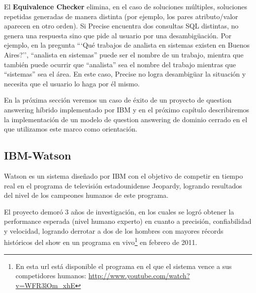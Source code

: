 El \textbf{Equivalence Checker} elimina, en el caso de soluciones múltiples, soluciones repetidas generadas de manera distinta (por ejemplo, los pares atributo/valor aparecen en otro orden). Si Precise encuentra dos consultas SQL distintas, no genera una respuesta sino que pide al usuario por una desambigüación. Por ejemplo, en la pregunta ```Qué trabajos de analista en sistemas existen en Buenos Aires?'', ``analista en sistemas'' puede ser el nombre de un trabajo, mientra que también puede ocurrir que ``analista'' sea el nombre del trabajo mientras que ``sistemas'' sea el área. En este caso, Precise no logra desambigüar la situación y necesita que el usuario lo haga por él mismo.

\medskip





En la próxima sección veremos un caso de éxito de un proyecto de question answering híbrido implementado por IBM y en el próximo capítulo describiremos la implementación de un modelo de question answering de dominio cerrado en el que utilizamos este marco como orientación.


\subsection{IBM-Watson}
\label{subsec:ibm-watson}
Watson\cite{WATSON1}\cite{WATSON2} es un sistema diseñado por IBM con el objetivo de competir en
tiempo real en el programa de televisión estadounidense Jeopardy,
logrando resultados del nivel de los campeones humanos de este
programa.

El proyecto demoró 3 años de investigación, en los cuales se
logró obtener la performance esperada (nivel humano experto) en
cuanto a precisión, confiabilidad y velocidad, logrando derrotar a
dos de los hombres con mayores récords históricos del show en un
programa en vivo\footnote{En esta url está disponible el programa en el que el sistema vence a sus competidores humanos: \url{http://www.youtube.com/watch?v=WFR3lOm_xhE}} en febrero de 2011.

